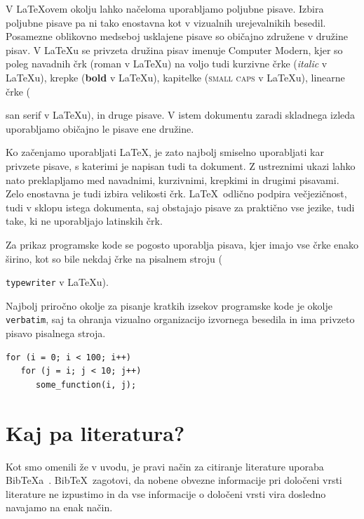 \documentclass[a4paper, 12pt]{book}
\newcommand{\BibTeX}{{\sc Bib}\TeX}
\begin{document}
V  \LaTeX ovem okolju lahko načeloma uporabljamo poljubne pisave. 
Izbira poljubne pisave pa ni tako enostavna kot v vizualnih urejevalnikih besedil.
Posamezne oblikovno medseboj usklajene pisave so običajno združene v družine pisav.
V \LaTeX u se privzeta družina pisav imenuje Computer Modern,
kjer so poleg navadnih črk (roman v \LaTeX u) na voljo tudi kurzivne črke (\textit{italic} v \LaTeX u), 
krepke (\textbf{bold} v \LaTeX u), kapitelke (\textsc{small caps} v \LaTeX u), linearne črke ({\textsf{san serif} v \LaTeX u),                                                                                                                                                                                                                                                                                                                           
in druge pisave.
V istem dokumentu zaradi skladnega izleda uporabljamo običajno le pisave ene družine. 

Ko začenjamo uporabljati \LaTeX, je zato najbolj smiselno uporabljati kar privzete pisave, s katerimi je napisan tudi ta dokument.
Z ustreznimi ukazi  lahko nato preklapljamo med navadnimi, kurzivnimi, krepkimi in drugimi pisavami. 
Zelo enostavna je tudi izbira velikosti črk.
\LaTeX\  odlično podpira večjezičnost, tudi v sklopu istega dokumenta, saj obstajajo pisave za praktično vse jezike, tudi take, ki ne uporabljajo latinskih črk.

Za prikaz programske kode se pogosto uporablja pisava, kjer imajo vse črke enako širino, kot so bile nekdaj črke na pisalnem stroju ({\texttt{typewriter} v \LaTeX u).

Najbolj priročno okolje za pisanje kratkih izsekov programske kode je okolje \texttt{verbatim}, saj ta ohranja vizualno organizacijo izvornega besedila in ima privzeto pisavo pisalnega stroja.

\begin{verbatim}
for (i = 0; i < 100; i++)
   for (j = i; j < 10; j++)
      some_function(i, j);
\end{verbatim}


\chapter{Kaj pa literatura?}
\label{lit}

Kot smo omenili že v uvodu, je pravi način za citiranje literature uporaba \BibTeX{}a~\cite{bib}. 
\BibTeX\ zagotovi, da nobene obvezne informacije pri določeni vrsti literature ne izpustimo in da vse informacije o določeni vrsti vira dosledno navajamo na enak način.

}}
\end{document}
